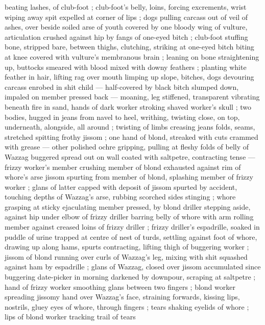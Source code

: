 beating lashes, of club-foot ; club-foot's belly, loins, forcing 
excrements, wrist wiping away spit expelled at corner of lips ; dogs 
pulling carcass out of veil of ashes, over beside soiled arse of youth 
covered by one bloody wing of vulture, articulation crushed against 
hip by fangs of one-eyed bitch ; club-foot stuffing bone, stripped 
bare, between thighs, clutching, striking at one-eyed bitch biting at 
knee covered with vulture's membranous brain ; leaning on bone 
straightening up, buttocks smeared with blood mixed with downy 
feathers ; planting white feather in hair, lifting rag over mouth 
limping up slope, bitches, dogs devouring carcass enrobed in shit 
child --- half-covered by black bitch slumped down, impaled on 
member pressed back --- moaning, leg stiffened, transparent 
vibrating beneath fire {\semislash} in sand, hands of dark worker stroking 
shaved worker's skull ; two bodies, hugged in jeans from navel to 
heel, writhing, twisting close, on top, underneath, alongside, all 
around ; twisting of limbs creasing jeans {\col} folds, seams, stretched 
spitting frothy jissom ; one hand of blond, streaked with cuts 
crammed with grease --- other polished ochre gripping, pulling at 
fleshy folds of belly of Wazzag buggered {\dashcom} spread out on wall 
coated with saltpetre, contracting tense --- frizzy worker's member 
crushing member of blond exhausted against rim of whore's arse 
jissom spurting from member of blond, splashing member of frizzy 
worker ; glans of latter capped with deposit of jissom spurted by 
accident, touching depths of Wazzag's arse, rubbing scorched sides 
stinging ; whore grasping at sticky ejaculating member pressed, by 
blond driller stepping aside, against hip under elbow of frizzy driller 
barring belly of whore with arm {\comdash} rolling member against creased 
loins of frizzy driller ; frizzy driller's espadrille, soaked in puddle of 
urine trapped at centre of nest of turds, settling against foot of 
whore, drawing up along hams, spurts contracting, lifting thigh of 
buggering worker ; jissom of blond running over curls of Wazzag's 
leg, mixing with shit squashed against ham by espadrille ; glans of 
Wazzag, closed over jissom accumulated since buggering date-picker 
in morning darkened by downpour, scraping at saltpetre ; hand of 
frizzy worker smoothing glans between two fingers ; blond worker 
spreading jissomy hand over Wazzag's face, straining forwards, 
kissing lips, nostrils, gluey eyes of whore, through fingers ; tears 
shaking eyelids of whore ; lips of blond worker tracking trail of tears 
